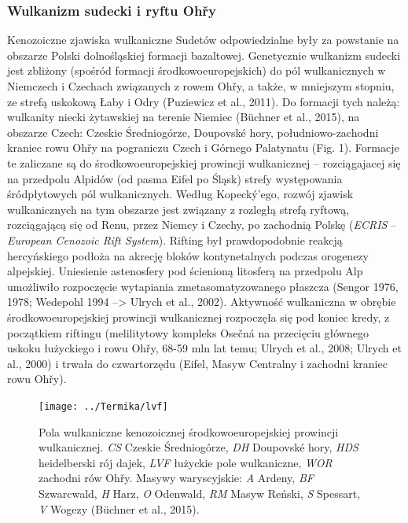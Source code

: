 \documentclass[11.5pt,twoside]{report}
\begin{document}
	\subsubsection{Wulkanizm sudecki i ryftu Oh\v{r}y}

Kenozoiczne zjawiska wulkaniczne Sudetów odpowiedzialne były za powstanie na obszarze Polski dolnośląskiej formacji bazaltowej. Genetycznie wulkanizm sudecki jest zbliżony (spośród formacji środkowoeuropejskich) do pól wulkanicznych w Niemczech i Czechach związanych z rowem Oh\v{r}y, a także, w mniejszym stopniu, ze strefą uskokową Łaby i Odry (Puziewicz et al., 2011). Do formacji tych należą: wulkanity niecki żytawskiej na terenie Niemiec (B\"{u}chner et al., 2015), na obszarze Czech: Czeskie Średniogórze, Doupovské hory, południowo-zachodni kraniec rowu Oh\v{r}y na pograniczu Czech i Górnego Palatynatu (Fig. 1). Formacje te zaliczane są do środkowoeuropejskiej prowincji wulkanicznej -- rozciągajacej się na przedpolu Alpidów (od pasma Eifel po Śląsk) strefy występowania śródpłytowych pól wulkanicznych. Według Kopeck\'{y}'ego, rozwój zjawisk wulkanicznych na tym obszarze jest związany z rozległą strefą ryftową, rozciągającą się od Renu, przez Niemcy i Czechy, po zachodnią Polskę (\textit{ECRIS} -- \textit{European Cenozoic Rift System}). Rifting był prawdopodobnie reakcją hercyńskiego podłoża na akrecję bloków kontynetalnych podczas orogenezy alpejskiej. Uniesienie astenosfery pod ścienioną litosferą na przedpolu Alp umożliwiło rozpoczęcie wytapiania zmetasomatyzowanego płaszcza (Sengor 1976, 1978; Wedepohl 1994 --> Ulrych et al., 2002). Aktywność wulkaniczna w obrębie środkowoeuropejskiej prowincji wulkanicznej rozpoczęła się pod koniec kredy, z początkiem riftingu (melilitytowy kompleks Osečná na przecięciu głównego uskoku łużyckiego i rowu Oh\v{r}y, 68-59 mln lat temu; Ulrych et al., 2008; Ulrych et al., 2000) i trwała do czwartorzędu (Eifel, Masyw Centralny i zachodni kraniec rowu Oh\v{r}y).

\begin{figure}
	\centering
	\texttt{[image: ../Termika/lvf]}
	\caption{Pola wulkaniczne kenozoicznej środkowoeuropejskiej prowincji wulkanicznej. \textit{CS} Czeskie Średniogórze, \textit{DH} Doupovsk\'{e} hory, \textit{HDS} heidelberski rój dajek, \textit{LVF} łużyckie pole wulkaniczne, \textit{WOR} zachodni rów Oh\v{r}y. Masywy waryscyjskie: \textit{A} Ardeny, \textit{BF} Szwarcwald, \textit{H} Harz, \textit{O} Odenwald, \textit{RM} Masyw Reński, \textit{S} Spessart, \textit{V} Wogezy (B\"{u}chner et al., 2015).} 
	\label{Fig.}
\end{figure}
\end{document}
